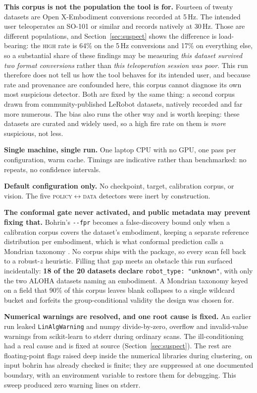 \documentclass[10pt,a4paper]{article}
\newcommand{\dtr}[1]{\texttt{\small #1}}
\begin{document}
\textbf{This corpus is not the population the tool is for.} Fourteen of twenty datasets are
Open X-Embodiment conversions recorded at 5\,Hz. The intended user teleoperates an SO-101 or
similar and records natively at 30\,Hz. Those are different populations, and
Section~\ref{sec:suspect} shows the difference is load-bearing: the \textsc{high} rate is
64\% on the 5\,Hz conversions and 17\% on everything else, so a substantial share of these
findings may be measuring \emph{this dataset survived two format conversions} rather than
\emph{this teleoperation session was poor}. This run therefore does not tell us how the tool
behaves for its intended user, and because rate and provenance are confounded here, this
corpus cannot diagnose its own most suspicious detector. Both are fixed by the same thing: a
second corpus drawn from community-published LeRobot datasets, natively recorded and far
more numerous. The bias also runs the other way and is worth keeping: these datasets are
curated and widely used, so a high fire rate on them is \emph{more} suspicious, not less.

\textbf{Single machine, single run.} One laptop CPU with no GPU, one pass per configuration,
warm cache. Timings are indicative rather than benchmarked: no repeats, no confidence
intervals.

\textbf{Default configuration only.} No checkpoint, target, calibration corpus, or vision.
The five \textsc{policy}$\leftrightarrow$\textsc{data} detectors were inert by construction.

\textbf{The conformal gate never activated, and public metadata may prevent fixing that.}
Bohrin's \texttt{-{}-fpr} becomes a false-discovery bound only when a calibration corpus
covers the dataset's embodiment, keeping a separate reference distribution per embodiment, which is what conformal prediction calls a Mondrian taxonomy \cite{vovk}. No
corpus ships with the package, so every scan fell back to a robust-$z$ heuristic. Filling
that gap meets an obstacle this run surfaced incidentally: \textbf{18 of the 20 datasets
declare} \mbox{\texttt{robot\_type:\,"unknown"}}, with only the two ALOHA datasets naming an
embodiment. A Mondrian taxonomy keyed on a field that 90\% of this corpus leaves blank
collapses to a single wildcard bucket and forfeits the group-conditional validity the design
was chosen for.

\textbf{Numerical warnings are resolved, and one root cause is fixed.} An earlier run leaked
\dtr{LinAlgWarning} and numpy divide-by-zero, overflow and invalid-value warnings from
scikit-learn to stderr during ordinary scans. The ill-conditioning had a real cause and is
fixed at source (Section~\ref{sec:suspect}). The rest are floating-point flags raised deep inside the
numerical libraries during clustering, on input bohrin has already checked is finite; they
are suppressed at one documented boundary, with an environment variable to restore them for
debugging. This sweep
produced zero warning lines on stderr.
\end{document}
